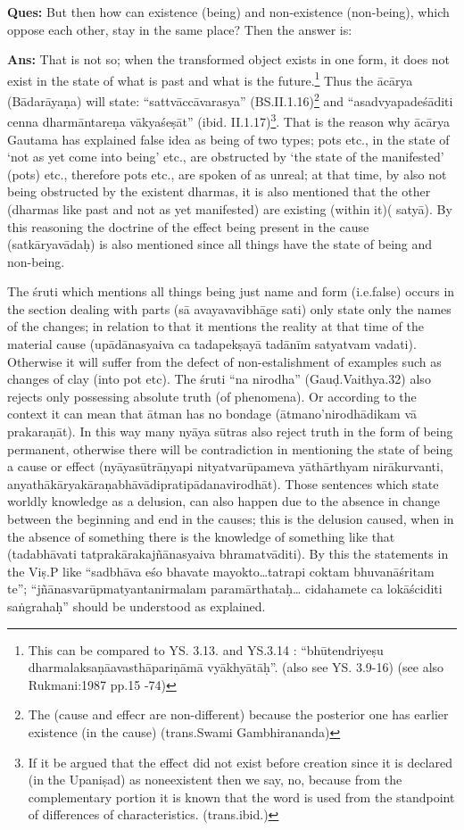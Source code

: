 \textbf{Ques:} But then how can existence (being) and non-existence (non-being), which oppose each other, stay in the same place? Then the answer is: 

\textbf{Ans:} That is not so; when the transformed object exists in one form, it does not exist in the state of what is past and what is the future.\footnote{This can be compared to YS. 3.13. and YS.3.14 : “bhūtendriyeṣu dharmalaksaṇāavasthāpariṇāmā vyākhyātāḥ”. (also see YS. 3.9-16) (see also Rukmani:1987 pp.15 -74)} Thus the ācārya (Bādarāyaṇa) will state: “sattvāccāvarasya” (BS.II.1.16)\footnote{The (cause and effecr are non-different) because the posterior one has earlier existence (in the cause) (trans.Swami Gambhirananda)} and “asadvyapadeśāditi cenna dharmāntareṇa vākyaśeṣāt” (ibid. II.1.17)\footnote{If it be argued that the effect did not exist before creation since it is declared (in the Upaniṣad) as noneexistent then we say, no, because from the complementary portion it is known that the word is used from the standpoint of differences of characteristics. (trans.ibid.)}. That is the reason why ācārya Gautama has explained false idea as being of two types; pots etc., in the state of ‘not as yet come into being’ etc., are obstructed by ‘the state of  the manifested’ (pots) etc., therefore pots etc., are spoken of as unreal; at that time, by also not being obstructed by the existent dharmas, it is also mentioned  that the other (dharmas like past and not as yet manifested) are existing (within it)( satyā). By this reasoning the doctrine of the effect being present in the cause (satkāryavādaḥ) is also mentioned since all things have the state of being and non-being. 

The śruti which mentions all things being just name and form (i.e.false) occurs in the section dealing with parts (sā avayavavibhāge sati) only state only the names of the changes; in relation to that it mentions the reality at that time of the material cause (upādānasyaiva ca tadapekṣayā tadānīm satyatvam vadati). Otherwise it will suffer from the defect of non-estalishment of examples such as changes of clay (into pot etc). The śruti “na nirodha” (Gauḍ.Vaithya.32) also rejects only possessing absolute truth (of phenomena). Or according to the context it can mean that ātman has no bondage (ātmano’nirodhādikam vā prakaraṇāt). In this way many nyāya sūtras also reject truth in the form of being permanent, otherwise there will be contradiction in mentioning the state of being a cause or effect (nyāyasūtrāṇyapi nityatvarūpameva yāthārthyam nirākurvanti, anyathākāryakāraṇabhāvādipratipādanavirodhāt). Those sentences which state worldly knowledge as a delusion, can also happen due to the absence in change between the beginning and end in the causes; this is the delusion caused, when in the absence of something there is the knowledge of something like that (tadabhāvati tatprakārakajñānasyaiva bhramatvāditi). By this the statements in the Viṣ.P like “sadbhāva eśo bhavate mayokto…tatrapi coktam bhuvanāśritam te”;  “jñānasvarūpmatyantanirmalam paramārthataḥ…\- cidahamete ca lokāściditi saṅgrahaḥ” should be understood as explained.

